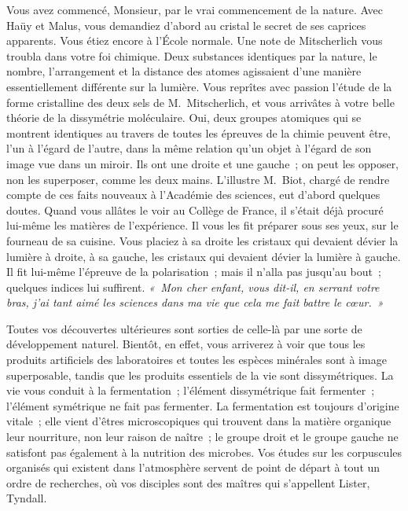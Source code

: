 \documentclass[french,twoside]{book} %
\newcommand\orgName[1]{#1}
\newcommand\persName[1]{#1}
\newcommand\placeName[1]{#1}
\begin{document}
Vous avez commencé, Monsieur, par le vrai commencement de la nature. Avec {\persName Haüy} et {\persName Malus}, vous demandiez d’abord au cristal le secret de ses caprices apparents. Vous étiez encore à l’{\orgName École normale}. Une note de {\persName Mitscherlich} vous troubla dans votre foi chimique. Deux substances identiques par la nature, le nombre, l’arrangement et la distance des atomes agissaient d’une manière essentiellement différente sur la lumière. Vous reprîtes avec passion l’étude de la forme cristalline des deux sels de {\persName M. Mitscherlich}, et vous arrivâtes à votre belle théorie de la dissymétrie moléculaire. Oui, deux groupes atomiques qui se montrent identiques au travers de toutes les épreuves de la chimie peuvent être, l’un à l’égard de l’autre, dans la même relation qu’un objet à l’égard de son image vue dans un miroir. Ils ont une droite et une gauche ; on peut les opposer, non les superposer, comme les deux mains. L’illustre {\persName M. Biot}, chargé de rendre compte de ces faits nouveaux à l’{\orgName Académie des sciences}, eut d’abord quelques doutes. Quand vous allâtes le voir au {\placeName Collège de France}, il s’était déjà procuré lui-même les matières de l’expérience. Il vous les fit préparer sous ses yeux, sur le fourneau de sa cuisine. Vous placiez à sa droite les cristaux qui devaient dévier la lumière à droite, à sa gauche, les cristaux qui devaient dévier la lumière à gauche. Il fit lui-même l’épreuve de la polarisation ; mais il n’alla pas jusqu’au bout ; quelques indices lui suffirent. \emph{« Mon cher enfant, vous dit-il, en serrant votre bras, j’ai tant aimé les sciences dans ma vie que cela me fait battre le cœur. »}\par
Toutes vos découvertes ultérieures sont sorties de celle-là par une sorte de développement naturel. Bientôt, en effet, vous arriverez à voir que tous les produits artificiels des laboratoires et toutes les espèces minérales sont à image superposable, tandis que les produits essentiels de la vie sont dissymétriques. La vie vous conduit à la fermentation ; l’élément dissymétrique fait fermenter ; l’élément symétrique ne fait pas fermenter. La fermentation est toujours d’origine vitale ; elle vient d’êtres microscopiques qui trouvent dans la matière organique leur nourriture, non leur raison de naître ; le groupe droit et le groupe gauche ne satisfont pas également à la nutrition des microbes. Vos études sur les corpuscules organisés qui existent dans l’atmosphère servent de point de départ à tout un ordre de recherches, où vos disciples sont des maîtres qui s’appellent {\persName Lister}, {\persName Tyndall}.\par
\end{document}
